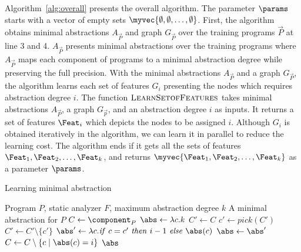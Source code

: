 Algorithm~\ref{alg:overall} presents the overall algorithm. The
parameter $\params$ starts with a vector of empty sets
$\myvec{\emptyset,\emptyset,\dots,\emptyset}$.
First, the algorithm obtains minimal abstractions $A_\vec{P}$ and
graph $G_\vec{P}$  over the training
programs $\vec{P}$ at line 3 and 4. $A_\vec{P}$ presents minimal
abstractions over the training programs where $A_\vec{P}$ maps each
component of programs to a minimal abstraction degree while preserving
the full precision.
With the minimal abstractions $A_\vec{P}$ and a graph $G_\vec{P}$, the algorithm
learns each set of features $G_i$ presenting the nodes which requires abstraction degree $i$.
The function $\textsc{LearnSetofFeatures}$ takes minimal abstractions
$A_\vec{P}$, a graph $G_\vec{p}$, and an abstraction degree $i$ as
inputs.
It returns a set of features $\Feat_i$ which depicts the nodes to be assigned $i$.
Although $G_i$ is obtained iteratively in the algorithm, we can learn it in parallel to reduce the learning cost.
The algorithm ends if it gets all the sets of features $\Feat_1,
\Feat_2,\dots, \Feat_k$, and returns $\myvec{\Feat_1, \Feat_2,\dots, \Feat_k}$ as a parameter $\params$.


\clearpage

\begin{algorithm}[t]
	\caption{Learning minimal abstraction}\label{alg:Learnminimal}%
	\begin{algorithmic}[1]
			\Require Program $P$, static analyzer $F$, maximum abstraction degree $k$
		\Ensure A minimal abstraction for $P$
		\State
		$C \gets \component_{P}$
		\State
		$\abs \gets \lambda c. k$
		\State
		$C' \gets C$
			\State
			$c' \gets pick(C')$
			\State
			$C' \gets C' \setminus \{c'\}$
			\State
			$\abs' \gets \lambda c. {\it if}~c=c'~{\it then}~i-1~{\it else}~\abs(c)$
				\State
				$\abs \gets \abs'$
			\EndIf
		\EndWhile
		\State
		$C \gets C \setminus \{c \mid \abs(c) = i\}$
		\EndFor
		\State \Return $\abs$
		\EndProcedure
	\end{algorithmic}
\end{algorithm}



